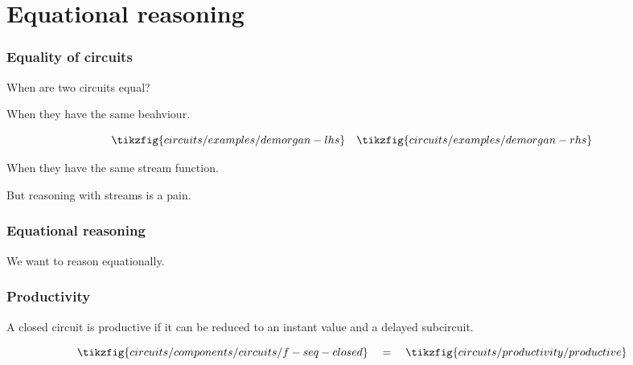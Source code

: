 \section{Equational reasoning}

\begin{frame}
    \frametitle{Equality of circuits}

    When are two circuits equal?

    \wait

    When they have the same \alert{beahviour}.

    \wait

    \[
        \tikzfig{circuits/examples/demorgan-lhs} 
        \quad
        \tikzfig{circuits/examples/demorgan-rhs} 
    \]

    When they have the same \alert{stream function}.

    \wait

    But reasoning with streams is a \alert{pain}.
    
\end{frame}

\begin{frame}
    \frametitle{Equational reasoning}

    We want to reason \alert{equationally}.

\end{frame}

\begin{frame}
    \frametitle{Productivity}


    A closed circuit is \alert{productive} if it can be reduced to an \alert{instant value} and a \alert{delayed subcircuit}.

    \[
        \tikzfig{circuits/components/circuits/f-seq-closed}
        \quad
        =
        \quad    
        \tikzfig{circuits/productivity/productive}
    \]

\end{frame}

